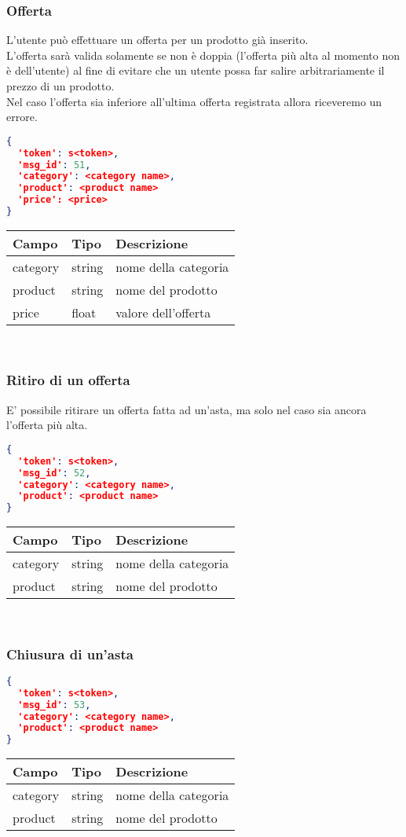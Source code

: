 \subsubsection{Offerta}
L'utente può effettuare un offerta per un prodotto già inserito.\\
L'offerta sarà valida solamente se non è doppia (l'offerta più alta al momento non è dell'utente) al fine di evitare che un utente possa far salire arbitrariamente il prezzo di un prodotto.\\
Nel caso l'offerta sia inferiore all'ultima offerta registrata allora riceveremo un errore.
\begin{lstlisting}[language=json]
{
  'token': s<token>,
  'msg_id': 51,
  'category': <category name>,
  'product': <product name>
  'price': <price>
}
\end{lstlisting}
\begin{tabular}{|l | l | l |}
\hline
Campo & Tipo & Descrizione \\ \hline
category & string & nome della categoria \\ \hline
product & string & nome del prodotto \\ \hline
price & float & valore dell'offerta \\ \hline
\end{tabular} \\

\subsubsection{Ritiro di un offerta}
E' possibile ritirare un offerta fatta ad un'asta, ma solo nel caso sia ancora l'offerta più alta.
\begin{lstlisting}[language=json]
{
  'token': s<token>,
  'msg_id': 52,
  'category': <category name>,
  'product': <product name>
}
\end{lstlisting}
\begin{tabular}{|l | l | l |}
\hline
Campo & Tipo & Descrizione \\ \hline
category & string & nome della categoria \\ \hline
product & string & nome del prodotto \\ \hline
\end{tabular} \\

\subsubsection{Chiusura di un'asta}
\begin{lstlisting}[language=json]
{
  'token': s<token>,
  'msg_id': 53,
  'category': <category name>,
  'product': <product name>
}
\end{lstlisting}
\begin{tabular}{|l | l | l |}
\hline
Campo & Tipo & Descrizione \\ \hline
category & string & nome della categoria \\ \hline
product & string & nome del prodotto \\ \hline
\end{tabular} \\
